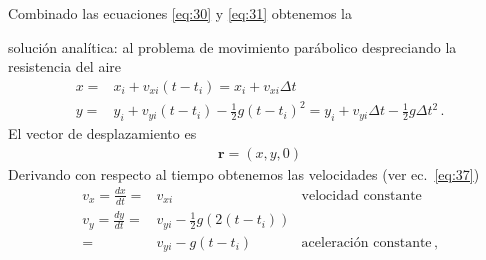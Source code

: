 Combinado las ecuaciones \eqref{eq:30} y \eqref{eq:31} obtenemos la
\begin{frame}
  \begin{block}%
{solución analítica:} al problema de movimiento parábolico despreciando la resistencia del aire
\begin{align}
  \label{eq:32}
  x=&x_i+v_{xi}(t-t_i)=x_i+v_{xi}\Delta t\nonumber\\
  y=&y_i+v_{yi}(t-t_i)-\frac{1}{2}g(t-t_i)^2=y_i+v_{yi}\Delta t-\frac{1}{2}g\Delta t^2\,.
\end{align}
El vector de desplazamiento es
\begin{align}
\mathbf{r}=(x,y,0)
\end{align}
Derivando con respecto al tiempo obtenemos las velocidades (ver ec.~\eqref{eq:37})
\begin{align}
  \label{eq:33}
  v_x=\frac{dx}{dt}=&v_{xi}&\text{velocidad constante}\nonumber\\
  v_y=\frac{dy}{dt}=&v_{yi}-\frac{1}{2}g(2(t-t_i))&\nonumber\\
  =&v_{yi}-g(t-t_i)&\text{aceleración constante}\,,
\end{align}

  \end{block}
\end{frame}



